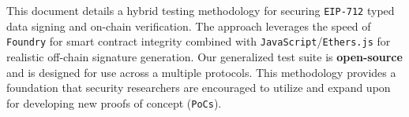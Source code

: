 This document details a hybrid testing methodology for securing \verb|EIP-712| typed data signing and on-chain verification. 
The approach leverages the speed of \texttt{Foundry} for smart contract integrity combined with \texttt{JavaScript}/\texttt{Ethers.js} for realistic off-chain signature generation. 
Our generalized test suite is \textbf{open-source} and is designed for use across a multiple protocols.
This methodology provides a foundation that security researchers are encouraged to utilize and expand upon for developing new proofs of concept (\texttt{PoCs}).